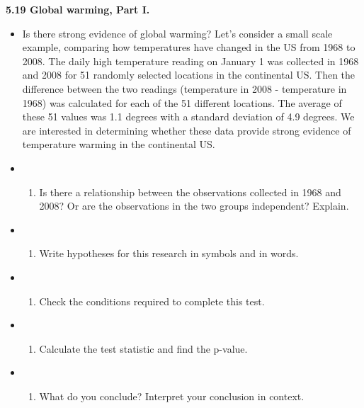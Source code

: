 \documentclass[]{book}
\providecommand{\tightlist}{%
  \setlength{\itemsep}{0pt}\setlength{\parskip}{0pt}}
\begin{document}
\textbf{5.19 Global warming, Part I.}

\begin{itemize}
\item
  Is there strong evidence of global warming? Let's consider a small scale example, comparing how temperatures have changed in the US from 1968 to 2008. The daily high temperature reading on January 1 was collected in 1968 and 2008 for 51 randomly selected locations in the continental US. Then the difference between the two readings (temperature in 2008 - temperature in 1968) was calculated for each of the 51 different locations. The average of these 51 values was 1.1 degrees with a standard deviation of 4.9 degrees. We are interested in determining whether these data provide strong evidence of temperature warming in the continental US.
\item
  \begin{enumerate}
  \def\labelenumi{(\alph{enumi})}
  \tightlist
  \item
    Is there a relationship between the observations collected in 1968 and 2008? Or are the observations in the two groups independent? Explain.
  \end{enumerate}
\item
  \begin{enumerate}
  \def\labelenumi{(\alph{enumi})}
  \setcounter{enumi}{1}
  \tightlist
  \item
    Write hypotheses for this research in symbols and in words.
  \end{enumerate}
\item
  \begin{enumerate}
  \def\labelenumi{(\alph{enumi})}
  \setcounter{enumi}{2}
  \tightlist
  \item
    Check the conditions required to complete this test.
  \end{enumerate}
\item
  \begin{enumerate}
  \def\labelenumi{(\alph{enumi})}
  \setcounter{enumi}{3}
  \tightlist
  \item
    Calculate the test statistic and find the p-value.
  \end{enumerate}
\item
  \begin{enumerate}
  \def\labelenumi{(\alph{enumi})}
  \setcounter{enumi}{4}
  \tightlist
  \item
    What do you conclude? Interpret your conclusion in context.
  \end{enumerate}

\end{itemize}
\end{document}

